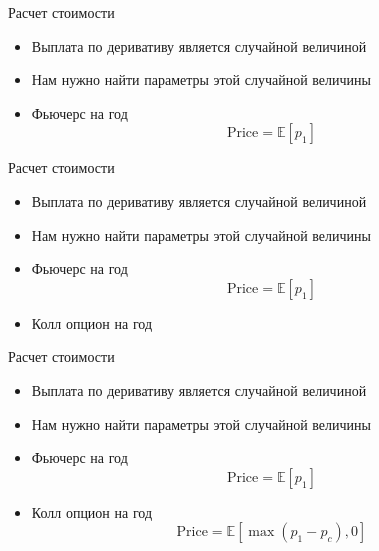\documentclass{beamer}
\newcommand{\E}{\ensuremath{\mathbb{E}}}
\begin{document}
        \begin{frame}{Расчет стоимости}
            \begin{itemize}
                \item Выплата по деривативу является случайной величиной
                \item Нам нужно найти параметры этой случайной величины
            \end{itemize}
            \begin{itemize}
                \item Фьючерс на год
                \[
                    \mathrm{Price} = \E \left[ p_1 \right]
                \]
            \end{itemize}
        \end{frame}

        \begin{frame}{Расчет стоимости}
            \begin{itemize}
                \item Выплата по деривативу является случайной величиной
                \item Нам нужно найти параметры этой случайной величины
            \end{itemize}
            \begin{itemize}
                \item Фьючерс на год
                \[
                    \mathrm{Price} = \E \left[ p_1 \right]
                \]
                \item Колл опцион на год
            \end{itemize}
        \end{frame}

        \begin{frame}{Расчет стоимости}
            \begin{itemize}
                \item Выплата по деривативу является случайной величиной
                \item Нам нужно найти параметры этой случайной величины
            \end{itemize}
            \begin{itemize}
                \item Фьючерс на год
                \[
                    \mathrm{Price} = \E \left[ p_1 \right]
                \]
                \item Колл опцион на год
                \[
                    \mathrm{Price} = \E \left[ \max{(p_1 - p_c), 0} \right]
                \]
            \end{itemize}
        \end{frame}


    
\end{document}
